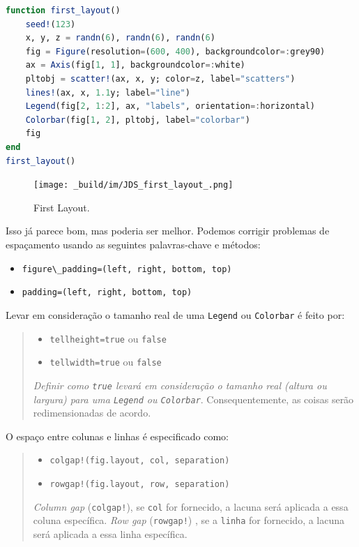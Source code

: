 \documentclass[
  notoc %
]{tufte-book}
\providecommand{\tightlist}{%
  \setlength{\itemsep}{0pt}\setlength{\parskip}{0pt}
}
\newcommand{\passthrough}[1]{#1}
\begin{document}
\begin{lstlisting}[language=Julia]
function first_layout()
    seed!(123)
    x, y, z = randn(6), randn(6), randn(6)
    fig = Figure(resolution=(600, 400), backgroundcolor=:grey90)
    ax = Axis(fig[1, 1], backgroundcolor=:white)
    pltobj = scatter!(ax, x, y; color=z, label="scatters")
    lines!(ax, x, 1.1y; label="line")
    Legend(fig[2, 1:2], ax, "labels", orientation=:horizontal)
    Colorbar(fig[1, 2], pltobj, label="colorbar")
    fig
end
first_layout()
\end{lstlisting}

\begin{figure}
\hypertarget{fig:first_layout}{%
\centering
\texttt{[image: \_build/im/JDS\_first\_layout\_.png]}
\caption{First Layout.}\label{fig:first_layout}
}
\end{figure}

Isso já parece bom, mas poderia ser melhor. Podemos corrigir problemas
de espaçamento usando as seguintes palavras-chave e métodos:

\begin{itemize}
\tightlist
\item
  \passthrough{\lstinline!figure\_padding=(left, right, bottom, top)!}
\item
  \passthrough{\lstinline!padding=(left, right, bottom, top)!}
\end{itemize}

Levar em consideração o tamanho real de uma
\passthrough{\lstinline!Legend!} ou \passthrough{\lstinline!Colorbar!} é
feito por:

\begin{quote}
\begin{itemize}
\tightlist
\item
  \passthrough{\lstinline!tellheight=true!} ou
  \passthrough{\lstinline!false!}
\item
  \passthrough{\lstinline!tellwidth=true!} ou
  \passthrough{\lstinline!false!}
\end{itemize}

\emph{Definir como \passthrough{\lstinline!true!} levará em consideração
o tamanho real (altura ou largura) para uma
\passthrough{\lstinline!Legend!} ou \passthrough{\lstinline!Colorbar!}}.
Consequentemente, as coisas serão redimensionadas de acordo.
\end{quote}

O espaço entre colunas e linhas é especificado como:

\begin{quote}
\begin{itemize}
\tightlist
\item
  \passthrough{\lstinline"colgap!(fig.layout, col, separation)"}
\item
  \passthrough{\lstinline"rowgap!(fig.layout, row, separation)"}
\end{itemize}

\emph{Column gap} (\passthrough{\lstinline"colgap!"}), se
\passthrough{\lstinline!col!} for fornecido, a lacuna será aplicada a
essa coluna específica. \emph{Row gap}
(\passthrough{\lstinline"rowgap!"}) , se a
\passthrough{\lstinline!linha!} for fornecido, a lacuna será aplicada a
essa linha específica.
\end{quote}
\end{document}
